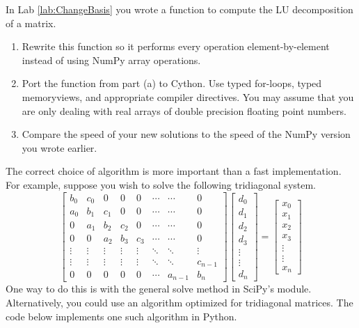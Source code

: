 \begin{problem}
In Lab \ref{lab:ChangeBasis} you wrote a function to compute the LU decomposition of a matrix.
\begin{enumerate}
\item Rewrite this function so it performs every operation element-by-element instead of using NumPy array operations.
\item Port the function from part (a) to Cython.
Use typed for-loops, typed memoryviews, and appropriate compiler directives.
You may assume that you are only dealing with real arrays of double precision floating point numbers.
\item Compare the speed of your new solutions to the speed of the NumPy version you wrote earlier.
\end{enumerate}
\end{problem}


The correct choice of algorithm is more important than a fast implementation.
For example, suppose you wish to solve the following tridiagonal system.
\[\begin{bmatrix}
b_0 & c_0 & 0 & 0 & 0 & \cdots & \cdots & 0 \\
a_0 & b_1 & c_1 & 0 & 0 & \cdots & \cdots & 0 \\
0 & a_1 & b_2 & c_2 & 0 & \cdots & \cdots & 0 \\
0 & 0 & a_2 & b_3 & c_3 & \cdots & \cdots & 0 \\
\vdots & \vdots & \vdots & \vdots & \vdots & \ddots & \ddots & \vdots \\
\vdots & \vdots & \vdots & \vdots & \vdots & \ddots & \ddots & c_{n-1} \\
0 & 0 & 0 & 0 & 0 & \cdots & a_{n-1} & b_n
\end{bmatrix}
\begin{bmatrix}
d_0\\
d_1\\
d_2\\
d_3\\
\vdots\\
\vdots\\
d_n
\end{bmatrix}
=
\begin{bmatrix}
x_0\\
x_1\\
x_2\\
x_3\\
\vdots\\
\vdots\\
x_n
\end{bmatrix}\]
One way to do this is with the general solve method in SciPy's  module.
Alternatively, you could use an algorithm optimized for tridiagonal matrices.
The code below implements one such algorithm in Python.

